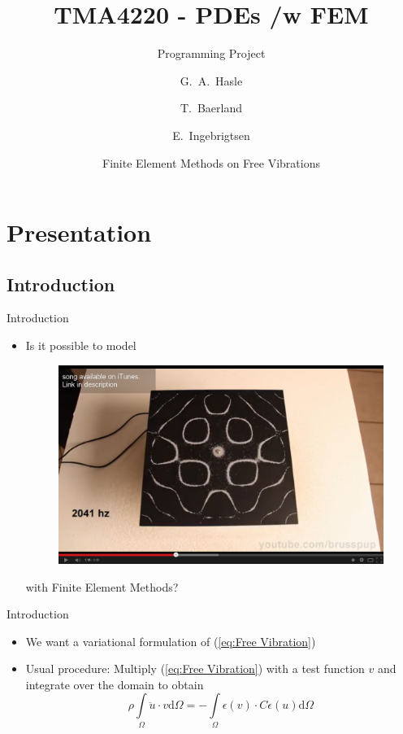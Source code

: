 \documentclass{beamer}[10pt]
\title{TMA4220 - PDEs /w FEM}
\subtitle{Programming Project}
\author{G.~A.~Hasle \and T.~Baerland \and E.~Ingebrigtsen}
\date{Finite Element Methods on Free Vibrations}
\begin{document}
\begin{frame}
  \titlepage
\end{frame}

\section{Presentation}

\subsection{Introduction}
\begin{frame}{Introduction}
  \begin{itemize}
  \begin{block}{The Free Vibration Equation}
\begin{equation}
\rho\frac{\partial^2u}{\partial t^2} = \nabla\sigma(u)
\label{eq:Free Vibration}
\end{equation}
\end{block}
  \item {   
    Is it possible to model 
    \begin{figure}
    \centering
    \includegraphics[scale=0.1]{yosnap.png}
    \end{figure}
	with Finite Element Methods?  
  }
  \end{itemize}
\end{frame}

\begin{frame}{Introduction}	
\begin{itemize}
\item {
We want a variational formulation of (\ref{eq:Free Vibration})

}
\item {
Usual procedure: Multiply (\ref{eq:Free Vibration}) with a test function $v$ and integrate over the domain to obtain 
\begin{equation}
\rho \int\limits_{\Omega} \ddot{u}\cdot v\mathrm{d}\Omega = - \int\limits_{\Omega}\epsilon\left(v\right)\cdot C \epsilon\left(u\right)\mathrm{d}\Omega
\label{eq:Variational Form}
\end{equation}
}
\end{itemize}
\end{frame}
\end{document}
